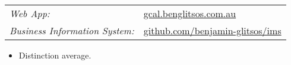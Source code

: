 \documentclass{resume}
\begin{document}
\vspace{-0.5em}


\begin{flushleft}
    \begin{tabularx}{\textwidth}{X X}
        \hfill\textit{Web App:} & \href{https://gcal.benglitsos.com.au/}{gcal.benglitsos.com.au} \\
        \hfill\textit{Business Information System:} & \href{https://github.com/benjamin-glitsos/inventory-management-system}{github.com/benjamin-glitsos/ims} \\
    \end{tabularx}
\end{flushleft}

\vspace{-0.5em}


\begin{flushleft}


    \begin{itemize}
    \item Distinction average.
    \end{itemize}

\end{flushleft}
\end{document}

